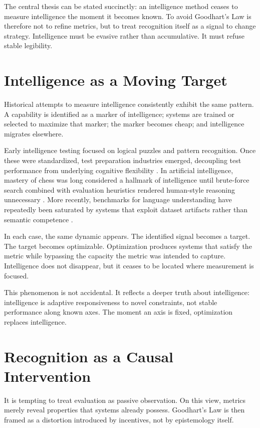 \documentclass[12pt]{article}
\begin{document}
The central thesis can be stated succinctly: an intelligence method ceases to measure intelligence the moment it becomes known. To avoid Goodhart’s Law is therefore not to refine metrics, but to treat recognition itself as a signal to change strategy. Intelligence must be evasive rather than accumulative. It must refuse stable legibility.

\section{Intelligence as a Moving Target}

Historical attempts to measure intelligence consistently exhibit the same pattern. A capability is identified as a marker of intelligence; systems are trained or selected to maximize that marker; the marker becomes cheap; and intelligence migrates elsewhere.

Early intelligence testing focused on logical puzzles and pattern recognition. Once these were standardized, test preparation industries emerged, decoupling test performance from underlying cognitive flexibility \cite{gould}. In artificial intelligence, mastery of chess was long considered a hallmark of intelligence until brute-force search combined with evaluation heuristics rendered human-style reasoning unnecessary \cite{newell}. More recently, benchmarks for language understanding have repeatedly been saturated by systems that exploit dataset artifacts rather than semantic competence \cite{geirhos}.

In each case, the same dynamic appears. The identified signal becomes a target. The target becomes optimizable. Optimization produces systems that satisfy the metric while bypassing the capacity the metric was intended to capture. Intelligence does not disappear, but it ceases to be located where measurement is focused.

This phenomenon is not accidental. It reflects a deeper truth about intelligence: intelligence is adaptive responsiveness to novel constraints, not stable performance along known axes. The moment an axis is fixed, optimization replaces intelligence.

\section{Recognition as a Causal Intervention}

It is tempting to treat evaluation as passive observation. On this view, metrics merely reveal properties that systems already possess. Goodhart’s Law is then framed as a distortion introduced by incentives, not by epistemology itself.
\end{document}
